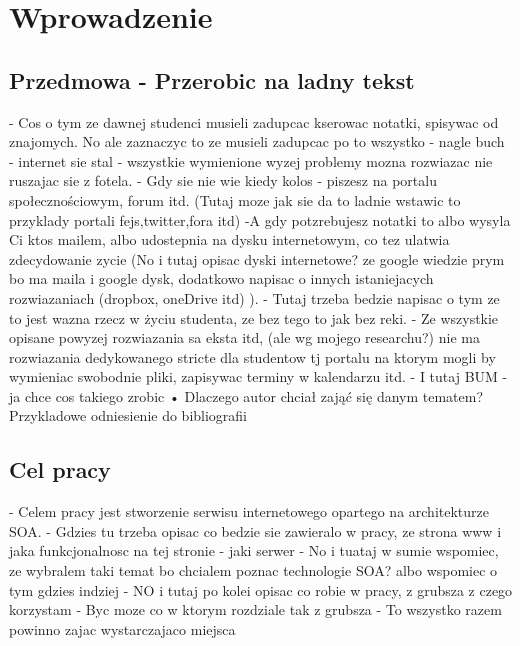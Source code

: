 \chapter{Wprowadzenie}
\label{cha:wprowadzenie}

\section{Przedmowa - Przerobic na ladny tekst}
- Cos o tym ze dawnej studenci musieli zadupcac kserowac notatki, spisywac od znajomych. No ale zaznaczyc to ze musieli zadupcac po to wszystko \newline
- nagle buch - internet sie stal - wszystkie wymienione wyzej problemy mozna rozwiazac nie ruszajac sie z fotela. \newline
- Gdy sie nie wie kiedy kolos - piszesz na portalu społecznościowym, forum itd. (Tutaj moze jak sie da to ladnie wstawic to przyklady portali fejs,twitter,fora itd)\newline
-A gdy potzrebujesz notatki to albo wysyla Ci ktos mailem, albo udostepnia na dysku internetowym, co tez ulatwia zdecydowanie zycie (No i tutaj opisac dyski internetowe? ze google wiedzie prym bo ma maila i google dysk, dodatkowo napisac o innych istaniejacych rozwiazaniach (dropbox, oneDrive itd) ). \newline
- Tutaj trzeba bedzie napisac o tym ze to jest wazna rzecz w życiu studenta, ze bez tego to jak bez reki. \newline
- Ze wszystkie opisane powyzej rozwiazania sa eksta itd, (ale wg mojego researchu?) nie ma rozwiazania dedykowanego stricte dla studentow tj portalu na ktorym mogli by wymieniac swobodnie pliki, zapisywac terminy w kalendarzu itd. \newline
- I tutaj BUM - ja chce cos takiego zrobic \newline
• Dlaczego autor chciał zająć się danym tematem? \newline
Przykladowe odniesienie do bibliografii \newline



\section{Cel pracy}

- Celem pracy jest stworzenie serwisu internetowego opartego na architekturze SOA.\newline
- Gdzies tu trzeba opisac co bedzie sie zawieralo w pracy, ze strona www i jaka funkcjonalnosc na tej stronie\newline
- jaki serwer \newline
- No i tuataj w sumie wspomiec, ze wybralem taki temat bo chcialem poznac technologie SOA? albo wspomiec o tym gdzies indziej\newline
- NO i tutaj po kolei opisac co robie w pracy, z grubsza z czego korzystam\newline
- Byc moze co w ktorym rozdziale tak z grubsza \newline
- To wszystko razem powinno zajac wystarczajaco miejsca \newline

